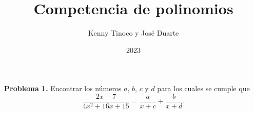\documentclass[12pt]{beamer}
\title{Competencia de polinomios}
\author{Kenny Tinoco y José Duarte}
\institute{Academia Sabatina de Jovenes Talento}
\date{2023}
\begin{document}
   \frame{\titlepage}

   \begin{frame}
      \textbf{Problema 1.}
      Encontrar los números $a$, $b$, $c$ y $d$ para los cuales se cumple que
      \[\frac{2x - 7}{4x^2 + 16 x + 15} = \frac{a}{x + c} + \frac{b}{x + d}.\]
   \end{frame}
\end{document}
